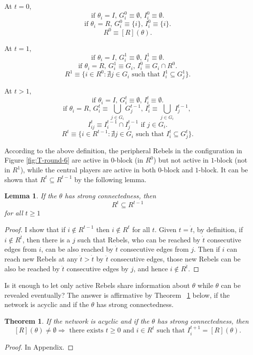 \documentclass[12pt,letter]{article}
\newtheorem{theorem}{Theorem}
\newtheorem{lemma}{Lemma}[section]
\theoremstyle{definition}
\theoremstyle{remark}
\theoremstyle{claim}
\begin{document}
At $t=0$,
\[\text{if $\theta_i=I$, $G^{0}_i\equiv \emptyset$, $I^{0}_i\equiv \emptyset$.}\] 
\[\text{if $\theta_i=R$, $G^{0}_i\equiv \{i\}$, $I^{0}_i\equiv \{i\}$.}\] 
\[\text{$R^0\equiv [R](\theta)$.}\] 

At $t=1$,
\[\text{if $\theta_i=I$, $G^{1}_i\equiv \emptyset$, $I^{1}_i\equiv \emptyset$.}\] 
\[\text{if $\theta_i=R$, $G^{1}_i\equiv G_i$, $I^{0}_i\equiv G_i\cap R^0$.}\] 
\[\text{$R^1\equiv \{i\in R^0: \nexists j\in G_i \text{ such that }I^1_i\subseteq G^1_j\}$.}\] 

At $t>1$, 
\[\text{if $\theta_i=I$, $G^{t}_i\equiv \emptyset$, $I^{t}_i\equiv \emptyset$.}\] 
\[\text{if $\theta_i=R$, $G^{t}_i\equiv \bigcup_{j\in G_i} G^{t-1}_j$, $I^{t}_i\equiv \bigcup_{j\in G_i} I^{t-1}_j$, }\] 
\[\text{$I^{t}_{ij}\equiv I^{t-1}_i\cap I^{t-1}_j$ if $j\in G_i$.}\]
\[\text{$R^t\equiv \{i\in R^{t-1}: \nexists j\in G_i \text{ such that }I^t_i\subseteq G^t_j\}$.}\]



According to the above definition, the peripheral Rebels in the configuration in Figure \ref{fig:T-round-6} are active in $0$-block (in $R^0$) but not active in $1$-block (not in $R^1$), while the central players are active in both $0$-block and $1$-block. It can be shown that $R^t\subseteq R^{t-1}$ by the following lemma. 
\begin{lemma}
\label{lemma_inclusion}
If the $\theta$ has strong connectedness, then 
\[R^t\subseteq R^{t-1}\] for all $t\geq 1$
\end{lemma}
\begin{proof}
I show that if $i\notin R^{t-1}$ then $i\notin R^t$ for all $t$. Given $t=\dot{t}$, by definition, if $i\notin R^{\dot{t}}$, then there is a $j$ such that Rebels, who can be reached by $\dot{t}$ consecutive edges from $i$, can be also reached by $\dot{t}$ consecutive edges from $j$. Then if $i$ can reach new Rebels at any $\ddot{t}>\dot{t}$ by $\ddot{t}$ consecutive edges, those new Rebels can be also be reached by $\ddot{t}$ consecutive edges by $j$, and hence $i\notin R^{\ddot{t}}$. 
\end{proof}

Is it enough to let only active Rebels share information about $\theta$ while $\theta$ can be revealed eventually? The answer is affirmative by Theorem ~\ref{lemma_empty} below, if the network is acyclic and if the $\theta$ has strong connectedness.
\begin{theorem}
\label{lemma_empty}
If the network is acyclic and if the $\theta$ has strong connectedness, then 
\[[R](\theta)\neq \emptyset \Rightarrow \text{ there exists } t\geq 0 \text{ and } i\in R^t \text{ such that }I^{t+1}_i=[R](\theta).\] 
\end{theorem}
\begin{proof}
In Appendix.
\end{proof}
\end{document}
